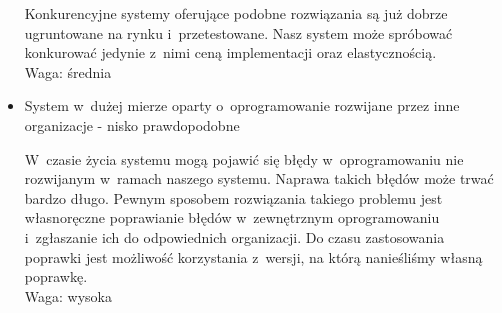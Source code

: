 \documentclass[../wstep.tex]{subfiles}
\begin{document}
\begin{itemize}
          Konkurencyjne systemy oferujące podobne rozwiązania są już dobrze ugruntowane na rynku i~przetestowane. Nasz system może spróbować konkurować jedynie z~nimi ceną implementacji oraz elastycznością.\\
          Waga: średnia
    \item System w~dużej mierze oparty o~oprogramowanie rozwijane przez inne organizacje - nisko prawdopodobne

          W~czasie życia systemu mogą pojawić się błędy w~oprogramowaniu nie rozwijanym w~ramach naszego systemu. Naprawa takich błędów może trwać bardzo długo. Pewnym sposobem rozwiązania takiego problemu jest własnoręczne poprawianie błędów w~zewnętrznym oprogramowaniu i~zgłaszanie ich do odpowiednich organizacji. Do czasu zastosowania poprawki jest możliwość korzystania z~wersji, na którą nanieśliśmy własną poprawkę.\\
          Waga: wysoka

\end{itemize}
\end{document}
